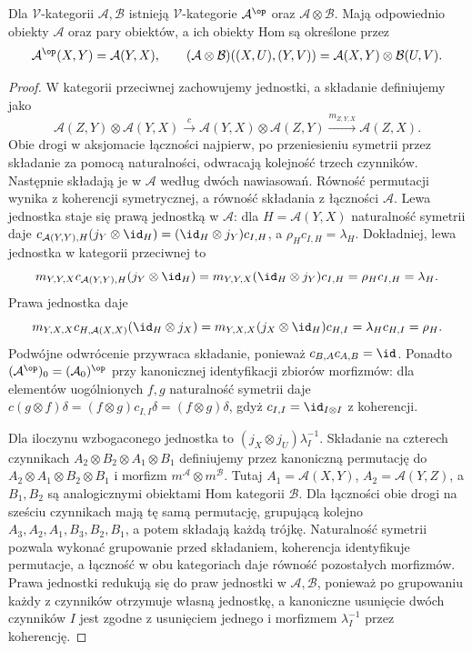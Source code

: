 \begin{stwierdzenie}\label{cat:prop:enriched-opposite-tensor}
Dla $\mathcal V$-kategorii $\mathcal A,\mathcal B$ istnieją $\mathcal V$-kategorie $\mathcal A^{\op}$ oraz $\mathcal A\otimes\mathcal B$. Mają odpowiednio obiekty $\mathcal A$ oraz pary obiektów, a ich obiekty Hom są określone przez
\[
 \mathcal A^{\op}(X,Y)=\mathcal A(Y,X),\qquad
 (\mathcal A\otimes\mathcal B)((X,U),(Y,V))
 =\mathcal A(X,Y)\otimes\mathcal B(U,V).
\]
\end{stwierdzenie}
\begin{proof}
W kategorii przeciwnej zachowujemy jednostki, a składanie definiujemy jako
\[
 \mathcal A(Z,Y)\otimes\mathcal A(Y,X)
 \xrightarrow{c}\mathcal A(Y,X)\otimes\mathcal A(Z,Y)
 \xrightarrow{m_{Z,Y,X}}\mathcal A(Z,X).
\]
Obie drogi w aksjomacie łączności najpierw, po przeniesieniu symetrii przez składanie za pomocą naturalności, odwracają kolejność trzech czynników. Następnie składają je w $\mathcal A$ według dwóch nawiasowań. Równość permutacji wynika z koherencji symetrycznej, a równość składania z łączności $\mathcal A$. Lewa jednostka staje się prawą jednostką w $\mathcal A$: dla $H=\mathcal A(Y,X)$ naturalność symetrii daje $c_{\mathcal A(Y,Y),H}(j_Y\otimes\id_H)=(\id_H\otimes j_Y)c_{I,H}$, a $\rho_H c_{I,H}=\lambda_H$. Dokładniej, lewa jednostka w kategorii przeciwnej to
\[
 m_{Y,Y,X}c_{\mathcal A(Y,Y),H}(j_Y\otimes\id_H)
 =m_{Y,Y,X}(\id_H\otimes j_Y)c_{I,H}
 =\rho_Hc_{I,H}=\lambda_H.
\]
Prawa jednostka daje
\[
 m_{Y,X,X}c_{H,\mathcal A(X,X)}(\id_H\otimes j_X)
 =m_{Y,X,X}(j_X\otimes\id_H)c_{H,I}
 =\lambda_Hc_{H,I}=\rho_H.
\]
Podwójne odwrócenie przywraca składanie, ponieważ $c_{B,A}c_{A,B}=\id$. Ponadto $(\mathcal A^{\op})_0=(\mathcal A_0)^{\op}$ przy kanonicznej identyfikacji zbiorów morfizmów: dla elementów uogólnionych $f,g$ naturalność symetrii daje $c(g\otimes f)\delta=(f\otimes g)c_{I,I}\delta=(f\otimes g)\delta$, gdyż $c_{I,I}=\id_{I\otimes I}$ z koherencji.

Dla iloczynu wzbogaconego jednostka to $(j_X\otimes j_U)\lambda_I^{-1}$. Składanie na czterech czynnikach $A_2\otimes B_2\otimes A_1\otimes B_1$ definiujemy przez kanoniczną permutację do $A_2\otimes A_1\otimes B_2\otimes B_1$ i morfizm $m^{\mathcal A}\otimes m^{\mathcal B}$. Tutaj $A_1=\mathcal A(X,Y)$, $A_2=\mathcal A(Y,Z)$, a $B_1,B_2$ są analogicznymi obiektami Hom kategorii $\mathcal B$. Dla łączności obie drogi na sześciu czynnikach mają tę samą permutację, grupującą kolejno $A_3,A_2,A_1,B_3,B_2,B_1$, a potem składają każdą trójkę. Naturalność symetrii pozwala wykonać grupowanie przed składaniem, koherencja identyfikuje permutacje, a łączność w obu kategoriach daje równość pozostałych morfizmów. Prawa jednostki redukują się do praw jednostki w $\mathcal A,\mathcal B$, ponieważ po grupowaniu każdy z czynników otrzymuje własną jednostkę, a kanoniczne usunięcie dwóch czynników $I$ jest zgodne z usunięciem jednego i morfizmem $\lambda_I^{-1}$ przez koherencję.
\end{proof}


